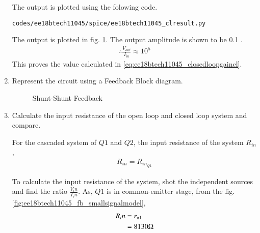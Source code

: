 \begin{enumerate}[label=\arabic*.,ref=\theenumi]
The output is plotted using the folowing code.
\begin{lstlisting}
codes/ee18btech11045/spice/ee18btech11045_clresult.py
\end{lstlisting}

The output is plotted in fig. \ref{fig:ee18btech11045_fb_clresult}. The output amplitude is shown to be 0.1 .
\begin{align}
    \therefore \frac{V_{out}}{I_{in}} \approx 10^{5}
\end{align}
This proves the value calculated in \eqref{eq:ee18btech11045_closedloopgaincl}.

\begin{figure}[h!]
	\begin{center}
		\resizebox{\columnwidth}{!}{}
	\end{center}
	\caption{}
	\label{fig:ee18btech11045_fb_clresult}
\end{figure}

\item Represent the circuit using a Feedback Block diagram.

\solution

\begin{figure}[!ht]
	\begin{center}
			\resizebox{\columnwidth}{!}{}
	\end{center}
\caption{Shunt-Shunt Feedback}
\label{fig:Block_Diagram}
\end{figure}

\item Calculate the input resistance of the open loop and closed loop system and compare.

\solution

For the cascaded system of $Q1$ and $Q2$, the input resistance of the system $R_{in}$,
\begin{align}
    R_{in} = R_{in_{Q1}}   
\end{align}

To calculate the input resistance of the system, shot the independent sources  and find the ratio $\frac{V_in}{I_in}$. As, $Q1$ is in common-emitter stage, from the fig. \ref{fig:ee18btech11045_fb_smallsignalmodel},
\begin{align}
    R_in &= r_{\pi1}
    \\
    &= 8130 \ohm
\end{align}


\end{enumerate}

